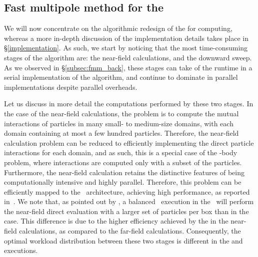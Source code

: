 

\subsection{Fast multipole method for the {\gpu}}

We will now concentrate on the algorithmic redesign of the {\fmm} for {\gpu} computing, whereas a more in-depth discussion of the implementation details takes place in \S\ref{implementation}. As such, we start by noticing that the most time-consuming stages of the {\fmm} algorithm are: the near-field calculations, and the downward sweep. As we observed in \S\ref{subsec:fmm_back}, these stages can take  of the runtime in a serial implementation of the algorithm, and continue to dominate in parallel implementations despite parallel overheads.


Let us discuss in more detail the computations performed by these two stages.  In the case of the near-field calculations, the problem is to compute the mutual interactions of particles in many small- to medium-size domains, with each domain containing at most a few hundred particles. Therefore, the near-field calculation problem can be reduced to efficiently implementing the direct particle interactions for each domain, and as such, this is a special case of the -body problem, where interactions are computed only with a subset of the  particles. Furthermore, the near-field calculation retains the distinctive features of being computationally intensive and highly parallel. Therefore, this problem can be efficiently mapped to the \gpu\ architecture, achieving high performance, as reported in~\cite{NylandHarrisPrins2007,BellemanEtal2008}.
We note that, as pointed out by \cite{NylandHarrisPrins2007}, a balanced \fmm\ execution in the \gpu\ will perform the near-field direct evaluation with a larger set of particles per box than in the {\cpu} case. This difference is due to the higher efficiency achieved by the {\gpu} in the near-field calculations, as compared to the far-field calculations. Consequently, the optimal workload distribution between these two stages is different in the {\gpu} and {\cpu} executions.

